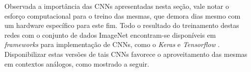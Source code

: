 Observada a importância das CNNs apresentadas nesta seção, vale notar o esforço computacional para o treino das mesmas, que demora dias mesmo com um hardware específico para este fim. Todo o resultado do treinamento destas redes com o conjunto de dados ImageNet encontram-se disponíveis em \emph{frameworks} para implementação de CNNs, como o  \emph{Keras} \cite{keras:applications} e \emph{Tensorflow} \cite{tensorflow:models}. Disponibilizar estas versões de tais CNNs favorece o aproveitamento das mesmas em contextos análogos, como mostrado a seguir.
